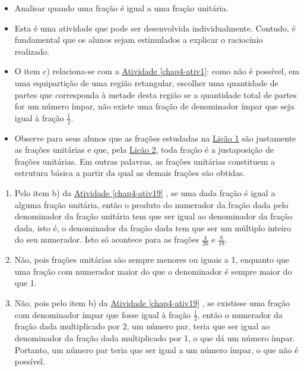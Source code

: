 \begin{atividade}\label{chap4-ativ22}
\objetivos
\begin{itemize} %
    \item       Analisar quando uma fração é igual a uma fração unitária.
\end{itemize} %

\discussoes
\begin{itemize} %
    \item       Esta é uma atividade que pode ser desenvolvida individualmente.
Contudo, é fundamental que os alunos sejam estimulados a explicar o raciocínio
realizado.
    \item       O item c) relaciona-se com a \hyperref[chap4-ativ1]{Atividade \ref{chap4-ativ1}}: como não é possível,
em uma equipartição de uma região retangular, escolher uma quantidade de partes
que corresponda à metade desta região se a quantidade total de partes for um
número ímpar, não existe uma fração de denominador ímpar que seja igual à fração
      $\frac{1}{2}$.
    \item       Observe para seus alunos que as frações estudadas na \hyperref[chap1]{Lição 1} são
justamente as frações unitárias e que, pela \hyperref[chap2]{Lição 2}, toda fração é a
justaposição de frações unitárias. Em outras palavras, as frações unitárias
constituem a estrutura básica a partir da qual as demais frações são obtidas.
\end{itemize} %

\solucao
\begin{enumerate} %
    \item       Pelo item b) da \hyperref[chap4-ativ19]{Atividade \ref{chap4-ativ19}}      , se uma dada fração é
igual a alguma fração unitária, então o produto do numerador da fração dada pelo
denominador da fração unitária tem que ser igual ao denominador da fração dada,
isto é, o denominador da fração dada tem que ser um múltiplo inteiro do seu
numerador. Isto só acontece para as frações       $\frac{4}{20}$       e
$\frac{6}{18}$.
    \item       Não, pois frações unitárias são sempre menores ou iguais a 1,
enquanto que uma fração com numerador maior do que o denominador é sempre maior
do que 1.

    \item       Não, pois pelo item b) da \hyperref[chap4-ativ19]{Atividade \ref{chap4-ativ19}}      , se
existisse uma fração com denominador ímpar que fosse igual à fração
$\frac{1}{2}$, então o numerador da fração dada multiplicado por       $2$, um
número par, teria que ser igual ao denominador da fração dada multiplicado por
1, o que dá um número ímpar. Portanto, um número par teria que ser igual a um
número ímpar, o que não é possível.
\end{enumerate} %
\end{atividade}

